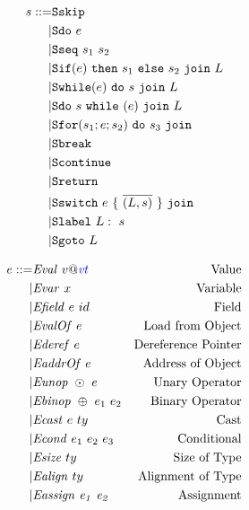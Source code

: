 \documentclass{llncs}
\begin{document}
{\begin{figure}
  \begin{subfigure}[t]{0.3\textwidth}
    \[\begin{aligned}
    s ::= & \mathtt{Sskip} \\
    | & \mathtt{Sdo} ~ e \\
    | & \mathtt{Sseq} ~ s_1 ~ s_2 \\
    | & \mathtt{Sif}(e) ~ \mathtt{then} ~ s_1 ~ \mathtt{else} ~ s_2 ~ \mathtt{join} ~ L \\
    | & \mathtt{Swhile}(e) ~ \mathtt{do} ~ s ~ \mathtt{join} ~ L \\
    | & \mathtt{Sdo} ~ s ~ \mathtt{while} ~ (e) ~ \mathtt{join} ~ L \\
    | & \mathtt{Sfor}(s_1; e; s_2) ~ \mathtt{do} ~ s_3 ~ \mathtt{join} ~ \\
    | & \mathtt{Sbreak} \\
    | & \mathtt{Scontinue} \\
    | & \mathtt{Sreturn} ~ \\
    | & \mathtt{Sswitch} ~ e ~ \{ ~ \overline{(L,s)} ~ \} ~ \mathtt{join} ~ \\
    | & \mathtt{Slabel} ~ L: ~ s \\
    | & \mathtt{Sgoto} ~ L \\    
    \end{aligned}\]
  \end{subfigure}
  \begin{subfigure}[t]{0.69\textwidth}
    \[\begin{aligned}
    \expr ::= & \val{v}{\vt} & \textnormal{Value} \\
    | & \var{x} & \textnormal{Variable} \\
    | & \field{\expr}{id} & \textnormal{Field} \\
    | & \valof{\expr} & \textnormal{Load from Object} \\
    | & \deref{\expr} & \textnormal{Dereference Pointer} \\
    | & \addrof{\expr} & \textnormal{Address of Object} \\
    | & \unop{\odot}{\expr} & \textnormal{Unary Operator} \\
    | & \binop{\oplus}{\expr_1}{\expr_2} & \textnormal{Binary Operator} \\
    | & \cast{\expr}{ty} & \textnormal{Cast} \\
    | & \condition{\expr_1}{\expr_2}{\expr_3} & \textnormal{Conditional} \\
    | & \sizeof{ty} & \textnormal{Size of Type} \\
    | & \alignof{ty} & \textnormal{Alignment of Type} \\
    | & \assign{\expr_1}{\expr_2} & \textnormal{Assignment} \\

\end{aligned}\]
\end{subfigure}
\end{figure}}
\end{document}
